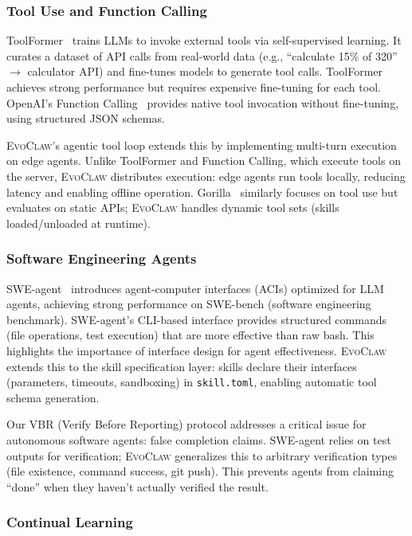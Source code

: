 \documentclass{article}
\newcommand{\evoclaw}{\textsc{EvoClaw}}
\begin{document}
\subsubsection{Tool Use and Function Calling}

ToolFormer~\cite{schick2023toolformer} trains LLMs to invoke external tools via self-supervised learning. It curates a dataset of API calls from real-world data (e.g., ``calculate 15\% of 320'' $\to$ calculator API) and fine-tunes models to generate tool calls. ToolFormer achieves strong performance but requires expensive fine-tuning for each tool. OpenAI's Function Calling~\cite{openai2023function} provides native tool invocation without fine-tuning, using structured JSON schemas.

\evoclaw{}'s agentic tool loop extends this by implementing multi-turn execution on edge agents. Unlike ToolFormer and Function Calling, which execute tools on the server, \evoclaw{} distributes execution: edge agents run tools locally, reducing latency and enabling offline operation. Gorilla~\cite{parisi2023gorilla} similarly focuses on tool use but evaluates on static APIs; \evoclaw{} handles dynamic tool sets (skills loaded/unloaded at runtime).

\subsubsection{Software Engineering Agents}

SWE-agent~\cite{yang2024sweagent} introduces agent-computer interfaces (ACIs) optimized for LLM agents, achieving strong performance on SWE-bench (software engineering benchmark). SWE-agent's CLI-based interface provides structured commands (file operations, test execution) that are more effective than raw bash. This highlights the importance of interface design for agent effectiveness. \evoclaw{} extends this to the skill specification layer: skills declare their interfaces (parameters, timeouts, sandboxing) in \texttt{skill.toml}, enabling automatic tool schema generation.

Our VBR (Verify Before Reporting) protocol addresses a critical issue for autonomous software agents: false completion claims. SWE-agent relies on test outputs for verification; \evoclaw{} generalizes this to arbitrary verification types (file existence, command success, git push). This prevents agents from claiming ``done'' when they haven't actually verified the result.

\subsubsection{Continual Learning}
\end{document}
